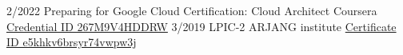 \begin{entrylist}
    \entry
    {2/2022}
    {Preparing for Google Cloud Certification: Cloud Architect}
    {Coursera}
    {{\href{https://www.coursera.org/account/accomplishments/professional-cert/267M9V4HDDRW}{Credential ID 267M9V4HDDRW}}}
    \entry
    {3/2019}
    {LPIC-2}
    {ARJANG institute}
    {{\href{''}{Certificate ID e5khkv6brsyr74vwpw3j}}}

\end{entrylist}